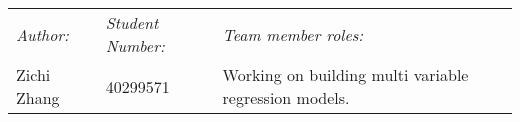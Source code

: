 \begin{titlepage}
\begin{center}
    \begin{table}[H]
        \centering
        \begin{tabularx}{\textwidth}{llX}
            \emph{Author:} & \emph{Student Number:} & \emph{Team member roles:} \\
            Zichi Zhang & 40299571 & Working on building multi variable regression models.\\

\end{tabularx}
\end{table}
\end{center}
\end{titlepage}
